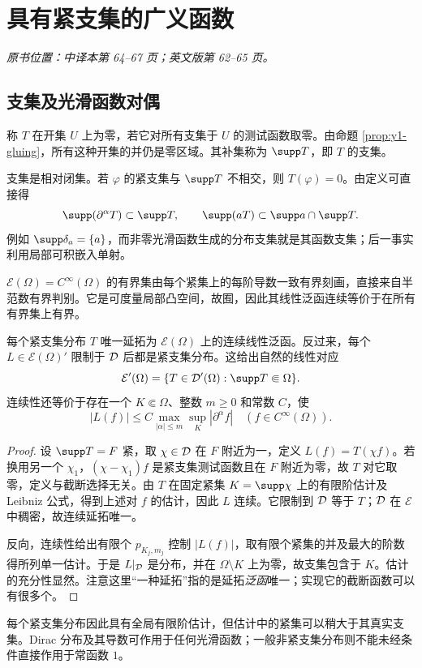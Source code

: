 \section{具有紧支集的广义函数}\label{sec:yosida-01-13}
\noindent\textit{原书位置：中译本第 64--67 页；英文版第 62--65 页。}

\subsection{支集及光滑函数对偶}
\begin{definition}[分布支集]
称 $T$ 在开集 $U$ 上为零，若它对所有支集于 $U$ 的测试函数取零。由命题 \ref{prop:y1-gluing}，所有这种开集的并仍是零区域。其补集称为 $\supp T$，即 $T$ 的支集。
\end{definition}
支集是相对闭集。若 $\varphi$ 的紧支集与 $\supp T$ 不相交，则 $T(\varphi)=0$。由定义可直接得
\[
 \supp(\partial^\alpha T)\subset\supp T,\qquad
 \supp(aT)\subset\supp a\cap\supp T.
\]
例如 $\supp\delta_a=\{a\}$，而非零光滑函数生成的分布支集就是其函数支集；后一事实利用局部可积嵌入单射。

$\mathcal E(\Omega)=C^\infty(\Omega)$ 的有界集由每个紧集上的每阶导数一致有界刻画，直接来自半范数有界判别。它是可度量局部凸空间，故囿，因此其线性泛函连续等价于在所有有界集上有界。

\begin{theorem}[紧支集分布等同于光滑函数的连续对偶]\label{thm:y1-Eprime}
每个紧支集分布 $T$ 唯一延拓为 $\mathcal E(\Omega)$ 上的连续线性泛函。反过来，每个 $L\in\mathcal E(\Omega)'$ 限制于 $\mathcal{D}$ 后都是紧支集分布。这给出自然的线性对应
\[
 \CompactDist(\Omega)=\{T\in\Dist(\Omega):\supp T\Subset\Omega\}.
\]
连续性还等价于存在一个 $K\Subset\Omega$、整数 $m\ge0$ 和常数 $C$，使
\[
 |L(f)|\le C\max_{|\alpha|\le m}\sup_K|\partial^\alpha f|
 \quad(f\in C^\infty(\Omega)).
\]
\end{theorem}
\begin{proof}
设 $\supp T=F$ 紧，取 $\chi\in\mathcal{D}$ 在 $F$ 附近为一，定义 $L(f)=T(\chi f)$。若换用另一个 $\chi_1$，$(\chi-\chi_1)f$ 是紧支集测试函数且在 $F$ 附近为零，故 $T$ 对它取零，定义与截断选择无关。由 $T$ 在固定紧集 $K=\supp\chi$ 上的有限阶估计及 Leibniz 公式，得到上述对 $f$ 的估计，因此 $L$ 连续。它限制到 $\mathcal{D}$ 等于 $T$；$\mathcal{D}$ 在 $\mathcal E$ 中稠密，故连续延拓唯一。

反向，连续性给出有限个 $p_{K_j,m_j}$ 控制 $|L(f)|$，取有限个紧集的并及最大的阶数得所列单一估计。于是 $L|_{\mathcal{D}}$ 是分布，并在 $\Omega\setminus K$ 上为零，故支集包含于 $K$。估计的充分性显然。注意这里“一种延拓”指的是延拓\emph{泛函}唯一；实现它的截断函数可以有很多个。
\end{proof}
每个紧支集分布因此具有全局有限阶估计，但估计中的紧集可以稍大于其真实支集。Dirac 分布及其导数可作用于任何光滑函数；一般非紧支集分布则不能未经条件直接作用于常函数 $1$。

